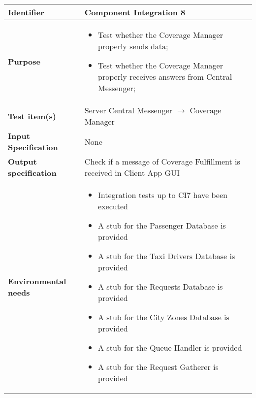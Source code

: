 \begin{center}
\begin{tabular}{lp{}}
\toprule
\textbf{Identifier}		&	Component Integration 8\\
\midrule
\textbf{Purpose}		&	\begin{itemize}
					\item Test whether the Coverage Manager properly sends data;
					\item Test whether the Coverage Manager properly receives answers from Central Messenger;
					\end{itemize}	\\
\textbf{Test item(s)}	&	Server Central Messenger $\rightarrow$ Coverage Manager\\
\textbf{Input Specification}	&	None\\
\textbf{Output specification}	&	Check if a message of Coverage Fulfillment is received in Client App GUI\\
\textbf{Environmental needs}	&	\begin{itemize}
							\item Integration tests up to CI7 have been executed
							\item A stub for the Passenger Database is provided
							\item A stub for the Taxi Drivers Database is provided
							\item A stub for the Requests Database is provided
							\item A stub for the City Zones Database is provided
							\item A stub for the Queue Handler is provided
							\item A stub for the Request Gatherer is provided
							\end{itemize}	\\
\bottomrule
\end{tabular}
\end{center}




